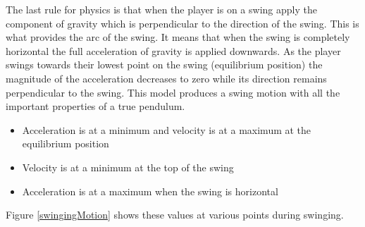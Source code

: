 \documentclass[]{report}
\begin{document}
			The last rule for physics is that when the player is on a swing apply the component of gravity which is perpendicular to the direction of the swing. This is what provides the arc of the swing. It means that when the swing is completely horizontal the full acceleration of gravity is applied downwards. As the player swings towards their lowest point on the swing (equilibrium position\cite{pendulumWiki}) the magnitude of the acceleration decreases to zero while its direction remains perpendicular to the swing. This model produces a swing motion with all the important properties of a true pendulum. 
			\begin{itemize}
				\item{Acceleration is at a minimum and velocity is at a maximum at the equilibrium position}
				\item{Velocity is at a minimum at the top of the swing}
				\item{Acceleration is at a maximum when the swing is horizontal}
			\end{itemize}
			Figure \ref{swingingMotion} shows these values at various points during swinging.
			
\end{document}
